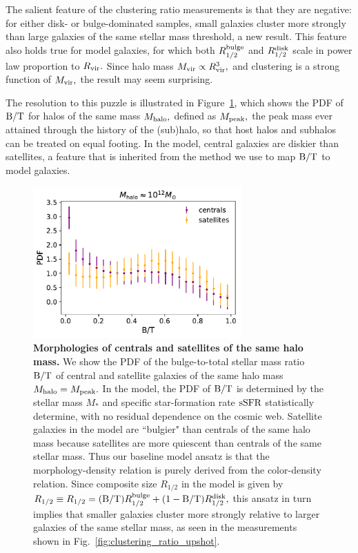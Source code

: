 \documentclass[usenatbib,usegraphicx,letterpaper]{mn2e}
\newcommand{\rhalf}{R_{1/2}}
\newcommand{\rhalfdisk}{R_{1/2}^{\rm disk}}
\newcommand{\rhalfbulge}{R_{1/2}^{\rm bulge}}
\newcommand{\rvir}{R_{\rm vir}}
\newcommand{\bt}{{\rm B/T}}
\newcommand{\mstar}{M_{\ast}}
\newcommand{\ssfr}{{\rm sSFR}}
\newcommand{\mvir}{M_{\rm vir}}
\newcommand{\mpeak}{M_{\rm peak}}
\newcommand{\mhalo}{M_{\rm halo}}
\begin{document}
The salient feature of the clustering ratio measurements is that they are negative: for either disk- or bulge-dominated samples, small galaxies cluster more strongly than large galaxies of the same stellar mass threshold, a new result. This feature also holds true for model galaxies, for which both $\rhalfbulge$ and $\rhalfdisk$ scale in power law proportion to $\rvir.$ Since halo mass $\mvir\propto\rvir^{3},$ and clustering is a strong function of $\mvir,$ the result may seem surprising.

The resolution to this puzzle is illustrated in Figure~\ref{fig:bt_censat}, which shows the PDF of $\bt$ for halos of the same mass $\mhalo,$ defined as $\mpeak,$ the peak mass ever attained through the history of the (sub)halo, so that host halos and subhalos can be treated on equal footing. In the model, central galaxies are diskier than satellites, a feature that is inherited from the method we use to map $\bt$ to model galaxies.

\begin{figure}
\centering
\includegraphics[width=8cm]{FIGS/random_bt_centrals_vs_satellites.pdf}
\caption{
{\bf Morphologies of centrals and satellites of the same halo mass.} We show the PDF of the bulge-to-total stellar mass ratio $\bt$ of central and satellite galaxies of the same halo mass $\mhalo=\mpeak.$ In the model, the PDF of $\bt$ is determined by the stellar mass $\mstar$ and specific star-formation rate $\ssfr$ statistically determine, with no residual dependence on the cosmic web. Satellite galaxies in the model are ``bulgier" than centrals of the same halo mass because satellites are more quiescent than centrals of the same stellar mass. Thus our baseline model ansatz is that the morphology-density relation is purely derived from the color-density relation. Since composite size $\rhalf$ in the model is given by $\rhalf\equiv\rhalf=(\bt)\rhalfbulge + (1-\bt)\rhalfdisk,$ this ansatz in turn implies that smaller galaxies cluster more strongly relative to larger galaxies of the same stellar mass, as seen in the measurements shown in Fig.~\ref{fig:clustering_ratio_upshot}.
}
\label{fig:bt_censat}
\end{figure}
\end{document}
